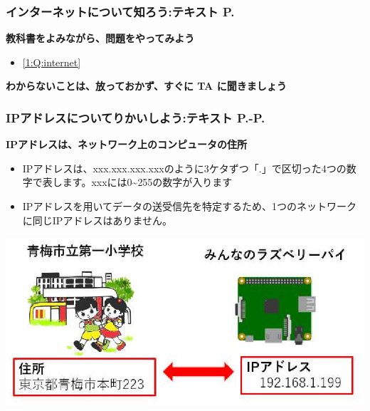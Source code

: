 \documentclass[dvipdfmx]{beamer}
\begin{document}
\begin{frame}[fragile]
	\frametitle{インターネットについて知ろう:テキスト P.\pageref{1:P:internet}~~~}
      \large\textbf{教科書をよみながら、問題をやってみよう}
				\begin{itemize}
					\item \ref*{1:Q:internet} 
				\end{itemize}
      \vfill
      \large\textbf{わからないことは、放っておかず、すぐに TA に聞きましょう}
\end{frame}

\begin{frame}[fragile]
	\frametitle{\large{IPアドレスについてりかいしよう:テキスト P.\pageref{1:P:IP}-P.\pageref{1:P:port}}~~~}
    \large\textbf{IPアドレスは、ネットワーク上のコンピュータの住所}
            \begin{itemize}
                \item IPアドレスは、xxx.xxx.xxx.xxxのように3ケタずつ「.」で区切った4つの数字で表します。xxxには0{\textasciitilde}255の数字が入ります
                \item IPアドレスを用いてデータの送受信先を特定するため、1つのネットワークに同じIPアドレスはありません。
            \end{itemize}
            \vfill
            
			\begin{minipage}{\textwidth}
                {\upshape
                  \includegraphics[width=\textwidth]{ome7-img003}}
            \end{minipage}
\end{frame}
\end{document}
